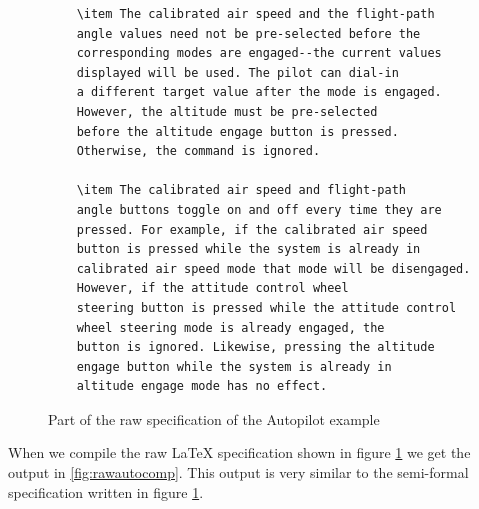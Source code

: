 \begin{figure}[H]
\begin{minipage}{0.45\textwidth}
\begin{tiny}
\begin{BVerbatim}
    \item The calibrated air speed and the flight-path 
    angle values need not be pre-selected before the
    corresponding modes are engaged--the current values
    displayed will be used. The pilot can dial-in
    a different target value after the mode is engaged. 
    However, the altitude must be pre-selected
    before the altitude engage button is pressed. 
    Otherwise, the command is ignored.
                       
    \item The calibrated air speed and flight-path 
    angle buttons toggle on and off every time they are
    pressed. For example, if the calibrated air speed 
    button is pressed while the system is already in
    calibrated air speed mode that mode will be disengaged.
    However, if the attitude control wheel
    steering button is pressed while the attitude control
    wheel steering mode is already engaged, the
    button is ignored. Likewise, pressing the altitude 
    engage button while the system is already in
    altitude engage mode has no effect.
     \end{BVerbatim}
    \end{tiny}
     \vspace{-0.2in}
     \vspace{-0.2in}
     \end{minipage}
     \caption{Part of the raw specification of the Autopilot example \label{fig:rawauto}}
     \end{figure}

When we compile the raw \LaTeX{} specification shown in figure \ref{fig:rawauto}
we get the output in \ref{fig:rawautocomp}. This output is very similar to the semi-formal
specification written in figure \ref{fig:rawauto}.


